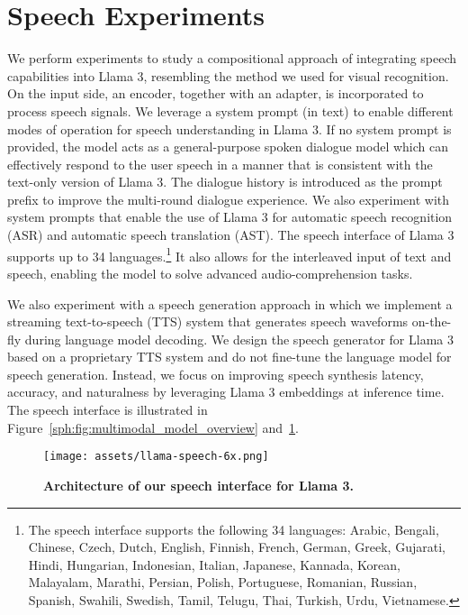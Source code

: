 \section{Speech Experiments}
\label{section:speech}

We perform experiments to study a compositional approach of integrating speech capabilities into Llama 3, resembling the method we used for visual recognition. On the input side, an encoder, together with an adapter, is incorporated to process speech signals. We leverage a system prompt (in text) to enable different modes of operation for speech understanding in Llama 3.
If no system prompt is provided, the model acts as a general-purpose spoken dialogue model which can effectively respond to the user speech in a manner that is consistent with the text-only version of Llama 3.
The dialogue history is introduced as the prompt prefix to improve the multi-round dialogue experience.
We also experiment with system prompts that enable the use of Llama 3 for automatic speech recognition (ASR) and automatic speech translation (AST).
The speech interface of Llama 3 supports up to 34 languages.\footnote{The speech interface supports the following 34 languages:
	Arabic,
	Bengali,
	Chinese,
	Czech,
	Dutch,
	English,
	Finnish,
	French,
	German,
	Greek,
	Gujarati,
	Hindi,
	Hungarian,
	Indonesian,
	Italian,
	Japanese,
	Kannada,
	Korean,
	Malayalam,
	Marathi,
	Persian,
	Polish,
	Portuguese,
	Romanian,
	Russian,
	Spanish,
	Swahili,
	Swedish,
	Tamil,
	Telugu,
	Thai,
	Turkish,
	Urdu,
	Vietnamese.}
It also allows for the interleaved input of text and speech, enabling the model to solve advanced audio-comprehension tasks.

We also experiment with a speech generation approach in which we implement a streaming text-to-speech (TTS) system that generates speech waveforms on-the-fly during language model decoding. We design the speech generator for Llama 3 based on a proprietary TTS system and do not fine-tune the language model for speech generation. Instead, we focus on improving speech synthesis latency, accuracy, and naturalness by leveraging Llama 3 embeddings at inference time.
The speech interface is illustrated in Figure~\ref{sph:fig:multimodal_model_overview} and~\ref{sph:fig:model}.

\begin{figure}
    \centering
    \texttt{[image: assets/llama-speech-6x.png]}
    \caption{\textbf{Architecture of our speech interface for Llama 3.}}
    \label{sph:fig:model}
\end{figure}





